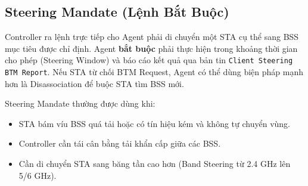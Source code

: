 \begin{algorithm}[H]
{{{{					
				}
				
			}{ %
			}
			
		}{ %
		}
		
	}{ %
	}
	
\end{algorithm}


%
\subsection{Steering Mandate (Lệnh Bắt Buộc)}

Controller ra lệnh trực tiếp cho Agent phải di chuyển một STA cụ thể sang BSS mục
tiêu được chỉ định. Agent \textbf{bắt buộc} phải thực hiện trong khoảng thời gian cho
phép (Steering Window) và báo cáo kết quả qua bản tin \texttt{Client Steering BTM
	Report}. Nếu STA từ chối BTM Request, Agent có thể dùng biện pháp mạnh hơn là
Disassociation để buộc STA tìm BSS mới.

Steering Mandate thường được dùng khi:
\begin{itemize}
	\item STA bám víu BSS quá tải hoặc có tín hiệu kém và không tự chuyển vùng.
	\item Controller cần tái cân bằng tải khẩn cấp giữa các BSS.
	\item Cần di chuyển STA sang băng tần cao hơn (Band Steering từ 2.4 GHz lên 5/6 GHz).
\end{itemize}


